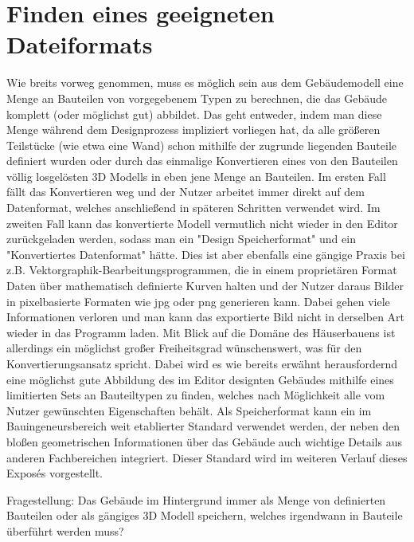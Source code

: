 \section{Finden eines geeigneten Dateiformats}
Wie breits vorweg genommen, muss es möglich sein aus dem Gebäudemodell eine Menge an Bauteilen von vorgegebenem Typen zu berechnen, die das Gebäude komplett (oder möglichst gut) abbildet.
Das geht entweder, indem man diese Menge während dem Designprozess impliziert vorliegen hat, da alle größeren Teilstücke (wie etwa eine Wand) schon mithilfe der zugrunde liegenden Bauteile definiert wurden oder durch das einmalige Konvertieren eines von den Bauteilen völlig losgelösten 3D Modells in eben jene Menge an Bauteilen.
Im ersten Fall fällt das Konvertieren weg und der Nutzer arbeitet immer direkt auf dem Datenformat, welches anschließend in späteren Schritten verwendet wird.
Im zweiten Fall kann das konvertierte Modell vermutlich nicht wieder in den Editor zurückgeladen werden, sodass man ein "Design Speicherformat" und ein "Konvertiertes Datenformat" hätte.
Dies ist aber ebenfalls eine gängige Praxis bei z.B. Vektorgraphik-Bearbeitungsprogrammen, die in einem proprietären Format Daten über mathematisch definierte Kurven halten und der Nutzer daraus Bilder in pixelbasierte Formaten wie jpg oder png generieren kann.
Dabei gehen viele Informationen verloren und man kann das exportierte Bild nicht in derselben Art wieder in das Programm laden.
Mit Blick auf die Domäne des Häuserbauens ist allerdings ein möglichst großer Freiheitsgrad wünschenswert, was für den Konvertierungsansatz spricht.
Dabei wird es wie bereits erwähnt herausfordernd eine möglichst gute Abbildung des im Editor designten Gebäudes mithilfe eines limitierten Sets an Bauteiltypen zu finden, welches nach Möglichkeit alle vom Nutzer gewünschten Eigenschaften behält.
Als Speicherformat kann ein im Bauingeneursbereich weit etablierter Standard verwendet werden, der neben den bloßen geometrischen Informationen über das Gebäude auch wichtige Details aus anderen Fachbereichen integriert.
Dieser Standard wird im weiteren Verlauf dieses Expos\'{e}s vorgestellt.

Fragestellung: Das Gebäude im Hintergrund immer als Menge von definierten Bauteilen oder als gängiges 3D Modell speichern, welches irgendwann in Bauteile überführt werden muss?

